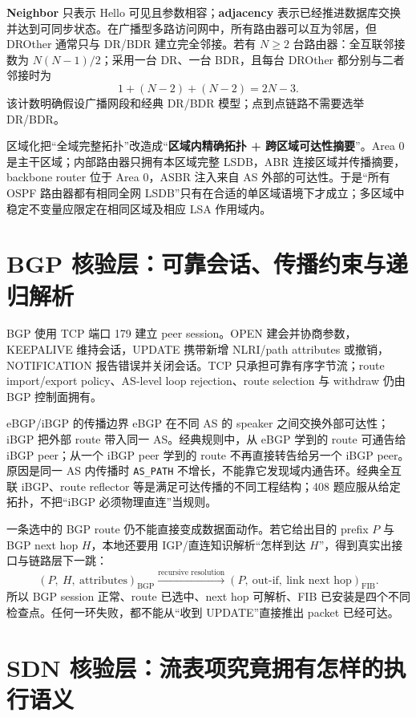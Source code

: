 \documentclass[11pt,a4paper]{ctexart}
\newcommand{\kw}[1]{\textbf{\color{deep}#1}}
\newcommand{\code}[1]{\texttt{#1}}
\begin{document}
\kw{Neighbor} 只表示 Hello 可见且参数相容；\kw{adjacency} 表示已经推进数据库交换并达到可同步状态。在广播型多路访问网中，所有路由器可以互为邻居，但 DROther 通常只与 DR/BDR 建立完全邻接。若有 $N\ge 2$ 台路由器：全互联邻接数为 $N(N-1)/2$；采用一台 DR、一台 BDR，且每台 DROther 都分别与二者邻接时为
\[
  1+(N-2)+(N-2)=2N-3.
\]
该计数明确假设广播网段和经典 DR/BDR 模型；点到点链路不需要选举 DR/BDR。

区域化把“全域完整拓扑”改造成“\kw{区域内精确拓扑 + 跨区域可达性摘要}”。Area 0 是主干区域；内部路由器只拥有本区域完整 LSDB，ABR 连接区域并传播摘要，backbone router 位于 Area 0，ASBR 注入来自 AS 外部的可达性。于是“所有 OSPF 路由器都有相同全网 LSDB”只有在合适的单区域语境下才成立；多区域中稳定不变量应限定在相同区域及相应 LSA 作用域内。

\section{BGP 核验层：可靠会话、传播约束与递归解析}

BGP 使用 TCP 端口 179 建立 peer session。OPEN 建会并协商参数，KEEPALIVE 维持会话，UPDATE 携带新增 NLRI/path attributes 或撤销，NOTIFICATION 报告错误并关闭会话。TCP 只承担可靠有序字节流；route import/export policy、AS-level loop rejection、route selection 与 withdraw 仍由 BGP 控制面拥有。

\begin{methodbox}{eBGP/iBGP 的传播边界}
eBGP 在不同 AS 的 speaker 之间交换外部可达性；iBGP 把外部 route 带入同一 AS。经典规则中，从 eBGP 学到的 route 可通告给 iBGP peer；从一个 iBGP peer 学到的 route 不再直接转告给另一个 iBGP peer。原因是同一 AS 内传播时 \code{AS\_PATH} 不增长，不能靠它发现域内通告环。经典全互联 iBGP、route reflector 等是满足可达传播的不同工程结构；408 题应服从给定拓扑，不把“iBGP 必须物理直连”当规则。
\end{methodbox}

一条选中的 BGP route 仍不能直接变成数据面动作。若它给出目的 prefix $P$ 与 BGP next hop $H$，本地还要用 IGP/直连知识解析“怎样到达 $H$”，得到真实出接口与链路层下一跳：
\[
  (P,\ H,\ \text{attributes})_{\mathrm{BGP}}
  \xrightarrow{\text{recursive resolution}}
  (P,\ \text{out-if},\ \text{link next hop})_{\mathrm{FIB}}.
\]
所以 BGP session 正常、route 已选中、next hop 可解析、FIB 已安装是四个不同检查点。任何一环失败，都不能从“收到 UPDATE”直接推出 packet 已经可达。

\section{SDN 核验层：流表项究竟拥有怎样的执行语义}
\end{document}
